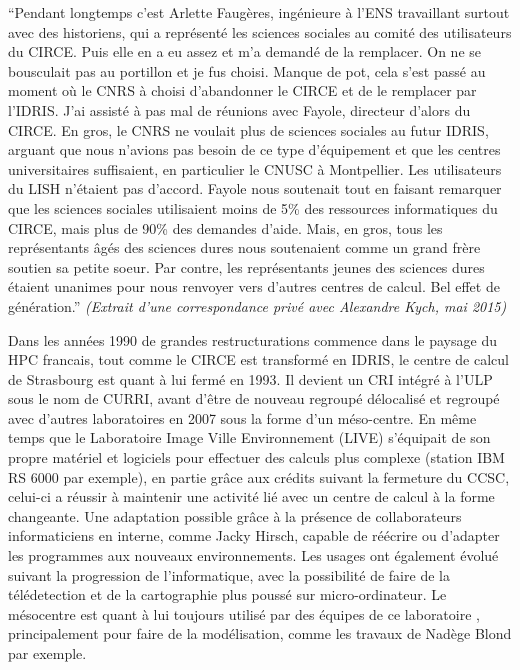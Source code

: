 \enquote{Pendant longtemps c'est Arlette Faugères, ingénieure à l'ENS travaillant surtout avec des historiens, qui a représenté les sciences sociales au comité des utilisateurs du CIRCE. Puis elle en a eu assez et m'a demandé de la remplacer. On ne se bousculait pas au portillon et je fus choisi. Manque de pot, cela s'est passé au moment où le CNRS à choisi d'abandonner le CIRCE et de le remplacer par l'IDRIS. J'ai assisté à pas mal de réunions avec Fayole, directeur d'alors du CIRCE. En gros, le CNRS ne voulait plus de sciences sociales au futur IDRIS, arguant que nous n'avions pas besoin de ce type d'équipement et que les centres universitaires suffisaient, en particulier le CNUSC à Montpellier. Les utilisateurs du LISH n'étaient pas d'accord. Fayole nous soutenait tout en faisant remarquer que les sciences sociales utilisaient moins de 5\% des ressources informatiques du CIRCE, mais plus de 90\% des demandes d'aide. Mais, en gros, tous les représentants âgés des sciences dures nous soutenaient comme un grand frère soutien sa petite soeur. Par contre, les représentants jeunes des sciences dures étaient unanimes pour nous renvoyer vers d'autres centres de calcul. Bel effet de génération.} \textit{(Extrait d'une correspondance privé avec Alexandre Kych, mai 2015)} 

Dans les années 1990 de grandes restructurations commence dans le paysage du HPC francais, tout comme le CIRCE est transformé en IDRIS, le centre de calcul de Strasbourg est quant à lui fermé en 1993. Il devient un CRI intégré à l'ULP sous le nom de CURRI, avant d'être de nouveau regroupé délocalisé et regroupé avec d'autres laboratoires en 2007 sous la forme d'un méso-centre. En même temps que le Laboratoire Image Ville Environnement (LIVE) s'équipait de son propre matériel et logiciels pour effectuer des calculs plus complexe (station IBM RS 6000 par exemple), en partie grâce aux crédits suivant la fermeture du CCSC, celui-ci a réussir à maintenir une activité lié avec un centre de calcul à la forme changeante. Une adaptation possible grâce à la présence de collaborateurs informaticiens en interne, comme Jacky Hirsch, capable de réécrire ou d'adapter les programmes aux nouveaux environnements. Les usages ont également évolué suivant la progression de l'informatique, avec la possibilité de faire de la télédetection et de la cartographie plus poussé sur micro-ordinateur. Le mésocentre est quant à lui toujours utilisé par des équipes de ce laboratoire \autocite{Asch2012}, principalement pour faire de la modélisation, comme les travaux de Nadège Blond par exemple.

